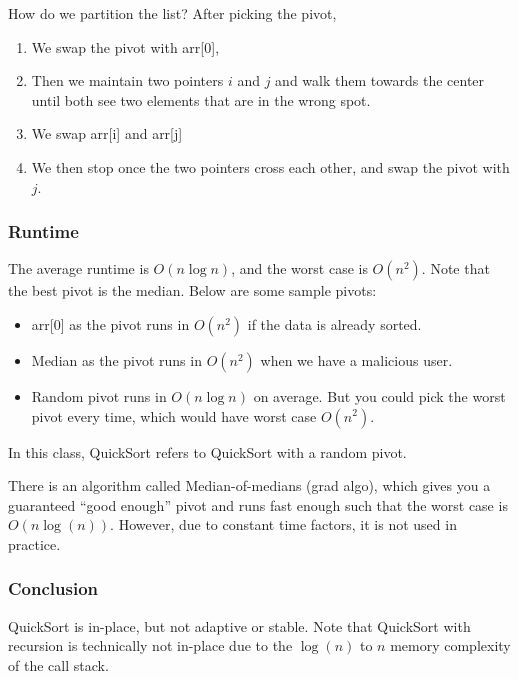 
How do we partition the list? After picking the pivot,
\begin{enumerate}
	\item We swap the pivot with arr[0],
	\item Then we maintain two pointers \( i \) and \( j \) and walk them towards the center until both see two elements that are in the wrong spot.
	\item We swap arr[i] and arr[j]
	\item We then stop once the two pointers cross each other, and swap the pivot with \( j \).
\end{enumerate}

\subsubsection{Runtime}
The average runtime is \( O(n \log n) \), and the worst case is \( O(n^2) \). Note that the best pivot is the median. Below are some sample pivots:

\begin{itemize}
	\item arr[0] as the pivot runs in \( O(n^2) \) if the data is already sorted.
	\item Median as the pivot runs in \( O(n^2) \) when we have a malicious user.
	\item Random pivot runs in \( O(n \log n) \) on average. But you could pick the worst pivot every time, which would have worst case \( O(n^2) \).
\end{itemize}

\begin{remark}
	In this class, QuickSort refers to QuickSort with a random pivot.
\end{remark}

\begin{note}
	There is an algorithm called Median-of-medians (grad algo), which gives you a guaranteed ``good enough'' pivot and runs fast enough such that the worst case is \( O(n\log (n)) \). However, due to constant time factors, it is not used in practice.
\end{note}

\subsubsection{Conclusion}
QuickSort is in-place, but not adaptive or stable. Note that QuickSort with recursion is technically not in-place due to the \( \log (n) \) to \( n \) memory complexity of the call stack.

